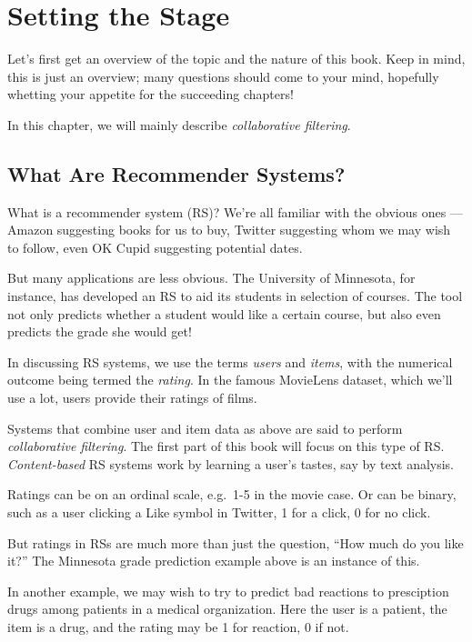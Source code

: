 \chapter{Setting the Stage}  
\label{chap:prologue} 

Let's first get an overview of the topic and the nature of this book.
Keep in mind, this is just an overview; many questions should come to
your mind, hopefully whetting your appetite for the succeeding chapters!

In this chapter, we will mainly describe \textit{collaborative
filtering}. 

\section{What Are Recommender Systems?}

What is a recommender system (RS)?  We're all familiar with the obvious
ones --- Amazon suggesting books for us to buy, Twitter suggesting whom
we may wish to follow, even OK Cupid suggesting potential dates. 

But many applications are less obvious.  The University of Minnesota,
for instance, has developed an RS to aid its students in selection of
courses.  The tool not only predicts whether a student would like a
certain course, but also even predicts the grade she would get!

In discussing RS systems, we use the terms \textit{users} and
\textit{items}, with the numerical outcome being
termed the \textit{rating}.  In the famous MovieLens dataset, which
we'll use a lot, users provide their ratings of films.

Systems that combine user and item data as above are said to perform
\textit{collaborative filtering}.  The first part of this book will
focus on this type of RS.  \textit{Content-based} RS systems work by
learning a user's tastes, say by text analysis.

Ratings can be on an ordinal scale, e.g.\ 1-5 in the movie case.  Or 
can be binary, such as a user clicking a Like symbol in Twitter, 1 for a
click, 0 for no click.

But ratings in RSs are much more than just the question, ``How much do
you like it?''  The Minnesota grade prediction example above is an
instance of this.

In another example, we may wish to try to predict bad reactions to
presciption drugs among patients in a medical organization.  Here the
user is a patient, the item is a drug, and the rating may be 1 for
reaction, 0 if not.  

